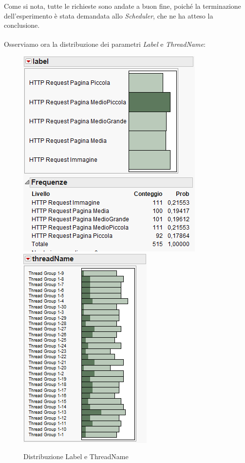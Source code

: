 		Come si nota, tutte le richieste sono andate a buon fine, poiché la terminazione dell'esperimento è stata demandata allo \emph{Scheduler}, che ne ha atteso la conclusione.\\\\
		Osserviamo ora la distribuzione dei parametri \textit{Label} e \textit{ThreadName}:
		
		\begin{figure}[H]
			\centering
			\includegraphics[scale=0.7]{./immagine/label.png}\quad\includegraphics[scale=0.96]{./immagine/threadname.png}
			\caption{Distribuzione Label e ThreadName}
			\label{fig:label_threadname}
		\end{figure}
		

